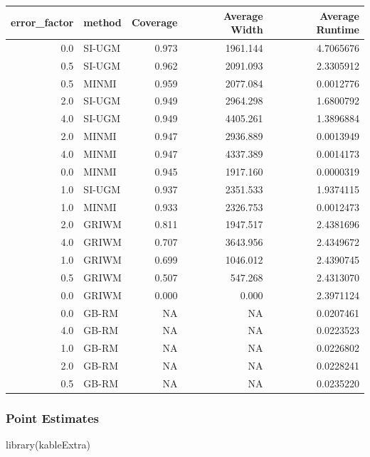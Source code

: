 \documentclass[
]{article}
\newenvironment{Shaded}{\begin{snugshade}}{\end{snugshade}}
\newcommand{\FunctionTok}[1]{\textcolor[rgb]{0.00,0.00,0.00}{#1}}
\newcommand{\NormalTok}[1]{#1}
\begin{document}
\begin{longtable}[]{@{}rlrrr@{}}
\toprule()
error\_factor & method & Coverage & Average Width & Average Runtime \\
\midrule()
\endhead
0.0 & SI-UGM & 0.973 & 1961.144 & 4.7065676 \\
0.5 & SI-UGM & 0.962 & 2091.093 & 2.3305912 \\
0.5 & MINMI & 0.959 & 2077.084 & 0.0012776 \\
2.0 & SI-UGM & 0.949 & 2964.298 & 1.6800792 \\
4.0 & SI-UGM & 0.949 & 4405.261 & 1.3896884 \\
2.0 & MINMI & 0.947 & 2936.889 & 0.0013949 \\
4.0 & MINMI & 0.947 & 4337.389 & 0.0014173 \\
0.0 & MINMI & 0.945 & 1917.160 & 0.0000319 \\
1.0 & SI-UGM & 0.937 & 2351.533 & 1.9374115 \\
1.0 & MINMI & 0.933 & 2326.753 & 0.0012473 \\
2.0 & GRIWM & 0.811 & 1947.517 & 2.4381696 \\
4.0 & GRIWM & 0.707 & 3643.956 & 2.4349672 \\
1.0 & GRIWM & 0.699 & 1046.012 & 2.4390745 \\
0.5 & GRIWM & 0.507 & 547.268 & 2.4313070 \\
0.0 & GRIWM & 0.000 & 0.000 & 2.3971124 \\
0.0 & GB-RM & NA & NA & 0.0207461 \\
4.0 & GB-RM & NA & NA & 0.0223523 \\
1.0 & GB-RM & NA & NA & 0.0226802 \\
2.0 & GB-RM & NA & NA & 0.0228241 \\
0.5 & GB-RM & NA & NA & 0.0235220 \\
\bottomrule()
\end{longtable}

\hypertarget{point-estimates}{%
\subsubsection{Point Estimates}\label{point-estimates}}

\begin{Shaded}
\begin{Highlighting}[]
\FunctionTok{library}\NormalTok{(kableExtra)}
\end{Highlighting}
\end{Shaded}
\end{document}
